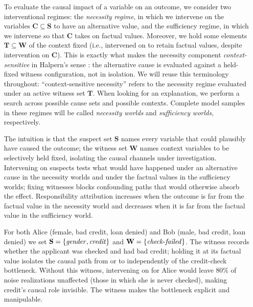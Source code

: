 To evaluate the causal impact of a variable on an outcome, we consider two interventional regimes: the \emph{necessity regime}, 
in which we intervene on the variables $\mathbf{C} \subseteq \mathbf{S}$ to have an alternative value, and the sufficiency regime,
 in which we intervene so that $\mathbf{C}$ takes on factual values. 
Moreover, we hold some elements $\mathbf{T} \subseteq \mathbf{W}$ of the context fixed (i.e., intervened on to retain factual values, despite intervention on $\mathbf{C}$). This is exactly what makes the necessity component \emph{context-sensitive} in Halpern's sense \citep{actualCausalityHalpern}: the alternative cause is evaluated against a held-fixed witness configuration, not in isolation. We will reuse this terminology throughout: ``context-sensitive necessity'' refers to the necessity regime evaluated under an active witness set $\mathbf{T}$.
When looking for an explanation, we perform a search across possible cause sets and possible contexts.
Complete model samples in these regimes will be called \emph{necessity worlds}  and \emph{sufficiency worlds}, respectively.

The intuition is that 
the suspect set $\mathbf{S}$ names every variable that could plausibly have caused the outcome; the witness set $\mathbf{W}$ names context
variables to be selectively held fixed, isolating the causal channels under investigation. Intervening
on suspects tests what would have happened under an alternative cause in the necessity worlds and under the factual values
 in the sufficiency worlds; fixing witnesses
blocks confounding paths that would otherwise absorb the effect.
Responsibility attribution increases when the outcome is far from the factual value in the necessity world and decreases 
when it is far from the factual value in the sufficiency world.




For both Alice (female, bad credit, loan denied) and Bob (male, bad credit, loan denied)
we set $\mathbf{S} = \{\varname{gender}, \varname{credit}\}$ and
$\mathbf{W} = \{\varname{check\text{-}failed}\}$. The witness 
records whether the applicant was checked and had bad credit; holding it at its factual
value isolates the causal path from  or  to 
independently of the credit-check bottleneck. Without this witness, intervening on
 for Alice would leave 80\% of noise realizations unaffected (those
in which she is never checked), making credit's causal role invisible. The witness makes
the bottleneck explicit and manipulable.

